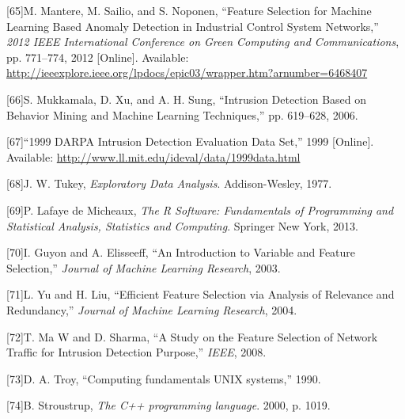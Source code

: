 \documentclass[11pt,]{article}
\begin{document}
{[}65{]}M. Mantere, M. Sailio, and S. Noponen, ``Feature Selection for
Machine Learning Based Anomaly Detection in Industrial Control System
Networks,'' \emph{2012 IEEE International Conference on Green Computing
and Communications}, pp. 771--774, 2012 {[}Online{]}. Available:
\url{http://ieeexplore.ieee.org/lpdocs/epic03/wrapper.htm?arnumber=6468407}

{[}66{]}S. Mukkamala, D. Xu, and A. H. Sung, ``Intrusion Detection Based
on Behavior Mining and Machine Learning Techniques,'' pp. 619--628,
2006.

{[}67{]}``1999 DARPA Intrusion Detection Evaluation Data Set,'' 1999
{[}Online{]}. Available:
\url{http://www.ll.mit.edu/ideval/data/1999data.html}

{[}68{]}J. W. Tukey, \emph{Exploratory Data Analysis}. Addison-Wesley,
1977.

{[}69{]}P. Lafaye de Micheaux, \emph{The R Software: Fundamentals of
Programming and Statistical Analysis, Statistics and Computing}.
Springer New York, 2013.

{[}70{]}I. Guyon and A. Elisseeff, ``An Introduction to Variable and
Feature Selection,'' \emph{Journal of Machine Learning Research}, 2003.

{[}71{]}L. Yu and H. Liu, ``Efficient Feature Selection via Analysis of
Relevance and Redundancy,'' \emph{Journal of Machine Learning Research},
2004.

{[}72{]}T. Ma W and D. Sharma, ``A Study on the Feature Selection of
Network Traffic for Intrusion Detection Purpose,'' \emph{IEEE}, 2008.

{[}73{]}D. A. Troy, ``Computing fundamentals UNIX systems,'' 1990.

{[}74{]}B. Stroustrup, \emph{The C++ programming language}. 2000, p.
1019.
\end{document}
